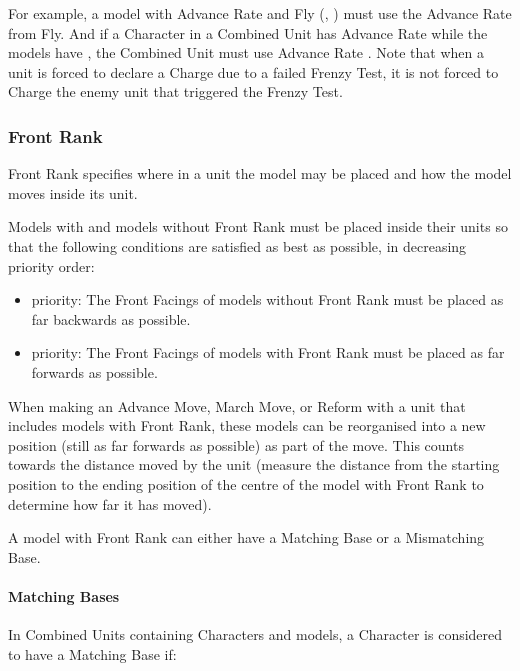 For example, a model with Advance Rate  and Fly (, ) must use the Advance Rate from Fly. And if a Character in a Combined Unit has Advance Rate  while the \rnf{} models have , the Combined Unit must use Advance Rate . Note that when a unit is forced to declare a Charge due to a failed Frenzy Test, it is not forced to Charge the enemy unit that triggered the Frenzy Test.

\subsubsection{Front Rank}
\idx[main=y]{\frontrank}\label{front_rank}

Front Rank specifies where in a unit the model may be placed and how the model moves inside its unit.

Models with and models without Front Rank must be placed inside their units so that the following conditions are satisfied as best as possible, in decreasing priority order:

\begin{itemize}
	\item {} priority: The Front Facings of models without Front Rank must be placed as far backwards as possible.
	\item {} priority: The Front Facings of models with Front Rank must be placed as far forwards as possible.
\end{itemize}

When making an Advance Move, March Move, or Reform with a unit that includes models with Front Rank, these models can be reorganised into a new position (still as far forwards as possible) as part of the move. This counts towards the distance moved by the unit (measure the distance from the starting position to the ending position of the centre of the model with Front Rank to determine how far it has moved).

A model with Front Rank can either have a Matching Base or a Mismatching Base.

\paragraph{Matching Bases}
\label{matching_bases}

In Combined Units containing Characters and \rnf{} models, a Character is considered to have a Matching Base if:

